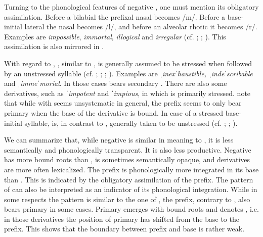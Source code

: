 Turning to the phonological features of negative , one must mention its obligatory assimilation. Before a bilabial the prefixal nasal becomes /m/. Before a base-initial lateral the nasal becomes /l/, and before an alveolar rhotic it becomes /r/. Examples are \textit{impossible}, \textit{immortal}, \textit{illogical} and \textit{irregular} (cf. \citealt[1687]{Bauer.2002}; \citealt[359]{Bauer.2013}; \citealt[123f.]{Okada.2013}). This assimilation is also mirrored in . 

With regard to , , similar to , is generally assumed to be stressed when followed by an unstressed syllable (cf. \citealt[473]{Jespersen.1965}; \citealt[381, 384]{Wells.2008};  \citealt[183]{Bauer.2013}; \citealt[126]{Okada.2013}). Examples are \textit{ˌinexˈhaustible, ˌindeˈscribable} and \textit{ˌimmeˈmorial}. In those cases  bears secondary . There are also some derivatives, such as \textit{ˈimpotent} and \textit{ˈimpious}, in which  is primarily stressed. \citet[183]{Bauer.2013} note that while   with  seems unsystematic in general,  the prefix seems to only bear primary  when the base of the derivative is bound.
In case of a stressed base-initial syllable,  is, in contrast to , generally taken to be unstressed (cf. \citealt{Wells.2008}; \citealt[183]{Bauer.2013}; \citealt[126]{Okada.2013}). 

We can summarize that, while negative  is similar in meaning to , it is less semantically and phonologically transparent. It is also less productive. Negative  has more bound roots than , is sometimes semantically opaque, and derivatives are more often lexicalized. The prefix is phonologically more integrated in its base than . This is indicated by the obligatory assimilation of the prefix. The  pattern of  can also be interpreted as an indicator of its phonological integration. While in some respects the  pattern is similar to the one of , the prefix, contrary to , also bears primary  in some cases. Primary  emerges with bound roots and denotes , i.e. in those derivatives the position of primary  has shifted from the base to the prefix. This shows that the boundary between prefix and base is rather weak.\\


